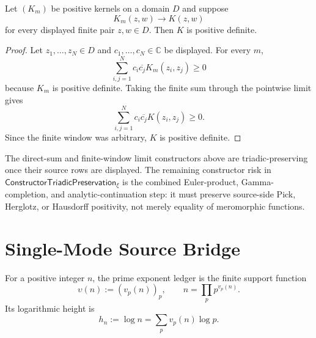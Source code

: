 \begin{theorem}
\label{thm:rh-finite-window-limits-preserve-positive-kernels}
Let $(K_m)$ be positive kernels on a domain $D$ and suppose
$$
K_m(z,w)\to K(z,w)
$$
for every displayed finite pair $z,w\in D$. Then $K$ is positive
definite.
\end{theorem}

\begin{proof}
Let $z_1,\ldots,z_N\in D$ and $c_1,\ldots,c_N\in\mathbb C$ be displayed.
For every $m$,
$$
\sum_{i,j=1}^{N}
c_i\overline{c_j}K_m(z_i,z_j)\ge0
$$
because $K_m$ is positive definite. Taking the finite sum through the
pointwise limit gives
$$
\sum_{i,j=1}^{N}
c_i\overline{c_j}K(z_i,z_j)\ge0.
$$
Since the finite window was arbitrary, $K$ is positive definite.
\end{proof}

\begin{principle}
\label{prin:rh-analytic-continuation-remaining-constructor-risk}
The direct-sum and finite-window limit constructors above are
triadic-preserving once their source rows are displayed. The remaining
constructor risk in $\mathsf{ConstructorTriadicPreservation}_{\xi}$ is
the combined Euler-product, Gamma-completion, and analytic-continuation
step: it must preserve source-side Pick, Herglotz, or Hausdorff
positivity, not merely equality of meromorphic functions.
\end{principle}


\section{Single-Mode Source Bridge}
\label{sec:rh-radial-single-mode-source-bridge}

\begin{definition}
\label{def:rh-prime-exponent-ledger-zeta-monomial}
For a positive integer $n$, the prime exponent ledger is the finite
support function
$$
\upsilon(n):=(v_p(n))_p,
\qquad
n=\prod_p p^{v_p(n)}.
$$
Its logarithmic height is
$$
h_n:=\log n=\sum_p v_p(n)\log p.
$$
\end{definition}

